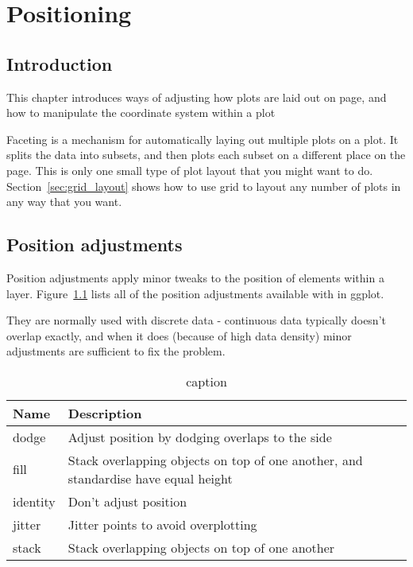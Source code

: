 
\chapter{Positioning}
\label{cha:position}

\section{Introduction}

This chapter introduces ways of adjusting how plots are laid out on page, and  how to manipulate the coordinate system within a plot

Faceting is a mechanism for automatically laying out multiple plots on a plot.  It splits the data into subsets, and then plots each subset on a different place on the page.  This is only one small type of plot layout that you might want to do.  Section~\ref{sec:grid_layout} shows how to use grid to layout any number of plots in any way that you want.

\section{Position adjustments}
\label{sec:position}

Position adjustments apply minor tweaks to the position of elements within a layer.  Figure~\ref{fig:position} lists all of the position adjustments available with in ggplot.  

They are normally used with discrete data - continuous data typically doesn't overlap exactly, and when it does (because of high data density) minor adjustments are sufficient to fix the problem.

\begin{table}
  \begin{center}
  \begin{tabular}{ll}
    \toprule
    Name      & Description  \\
    \midrule
    dodge    & Adjust position by dodging overlaps to the side \\
    fill     & Stack overlapping objects on top of one another, and standardise have equal height\\
    identity & Don't adjust position \\
    jitter   & Jitter points to avoid overplotting \\
    stack    & Stack overlapping objects on top of one another \\
    \bottomrule
  \end{tabular}
  \end{center}
  \caption{caption}
  \label{fig:position}
\end{table}

